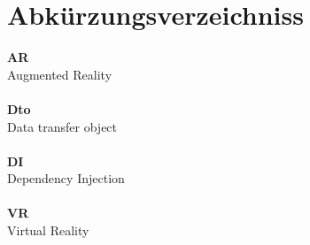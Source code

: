\section*{Abkürzungsverzeichniss}
\label{sec:abbrev}
  \textbf{AR}\\
  Augmented Reality\\~\\
  \textbf{Dto}\\
  Data transfer object\\~\\
  \textbf{DI}\\
  Dependency Injection\\~\\
  \textbf{VR}\\
  Virtual Reality\\~\\

